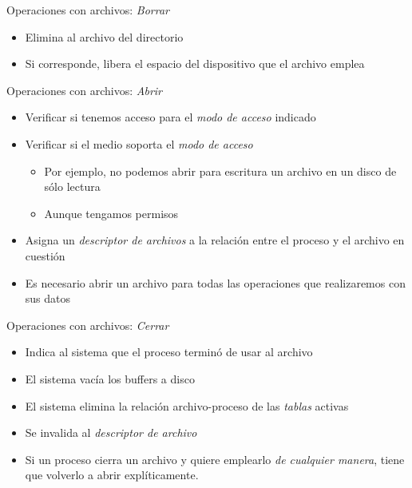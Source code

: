 \documentclass[presentation]{beamer}
\begin{document}
\begin{frame}[label={sec:org8358da5}]{Operaciones con archivos: \emph{Borrar}}
\begin{itemize}
\item Elimina al archivo del directorio
\item Si corresponde, libera el espacio del dispositivo que el archivo emplea
\end{itemize}
\end{frame}

\begin{frame}[label={sec:orged81fc9}]{Operaciones con archivos: \emph{Abrir}}
\begin{itemize}
\item Verificar si tenemos acceso para el \emph{modo de acceso} indicado
\item Verificar si el medio soporta el \emph{modo de acceso}
\begin{itemize}
\item Por ejemplo, no podemos abrir para escritura un archivo en un
disco de sólo lectura
\item Aunque tengamos permisos
\end{itemize}
\item Asigna un \emph{descriptor de archivos} a la relación entre el proceso y
el archivo en cuestión
\item Es necesario abrir un archivo para todas las operaciones que
realizaremos con sus datos
\end{itemize}
\end{frame}

\begin{frame}[label={sec:orgeeced55}]{Operaciones con archivos: \emph{Cerrar}}
\begin{itemize}
\item Indica al sistema que el proceso terminó de usar al archivo
\item El sistema vacía los buffers a disco
\item El sistema elimina la relación archivo-proceso de las \emph{tablas} activas
\item Se invalida al \emph{descriptor de archivo}
\item Si un proceso cierra un archivo y quiere emplearlo \emph{de cualquier
manera}, tiene que volverlo a abrir explíticamente.
\end{itemize}
\end{frame}
\end{document}
